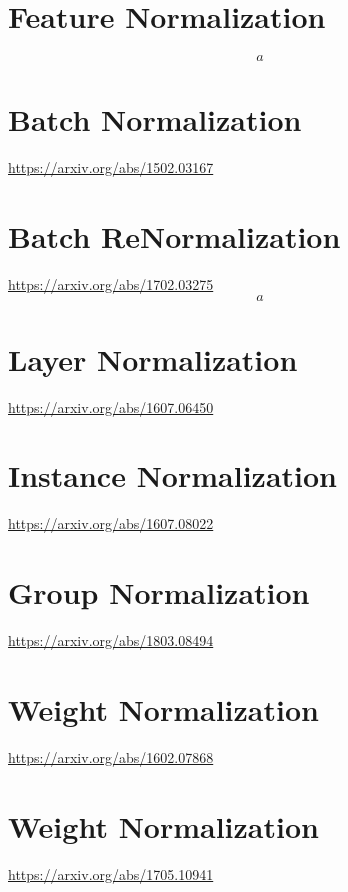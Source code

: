 \documentclass{article}
\begin{document}
    \section*{Feature Normalization}
        \begin{equation*}
            a 
        \end{equation*}

    \section*{Batch Normalization}
        \href{https://arxiv.org/abs/1502.03167}{https://arxiv.org/abs/1502.03167}

    \section*{Batch ReNormalization}
        \href{https://arxiv.org/abs/1702.03275}{https://arxiv.org/abs/1702.03275}
        \begin{equation*}
            a 
        \end{equation*}

    \section*{Layer Normalization}
        \href{https://arxiv.org/abs/1607.06450}{https://arxiv.org/abs/1607.06450}

    \section*{Instance Normalization}
        \href{https://arxiv.org/abs/1607.08022}{https://arxiv.org/abs/1607.08022}
        
    \section*{Group Normalization}
        \href{https://arxiv.org/abs/1803.08494}{https://arxiv.org/abs/1803.08494}

    \section*{Weight Normalization}
        \href{https://arxiv.org/abs/1602.07868}{https://arxiv.org/abs/1602.07868}

    \section*{Weight Normalization}
        \href{https://arxiv.org/abs/1705.10941}{https://arxiv.org/abs/1705.10941}
\end{document}
